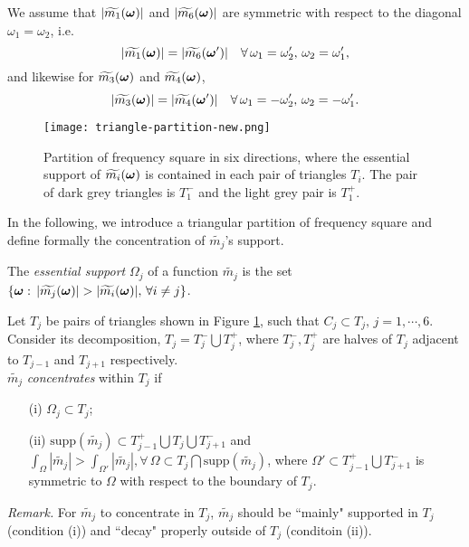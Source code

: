 We assume that
$|\widetilde{m_{1}}(\boldsymbol{\omega})|$ and $|\widetilde{m_{6}}(\boldsymbol{\omega})|$ are symmetric with respect to the diagonal $\omega_1=\omega_2$, i.e.
$$ |\widetilde{m_1}(\boldsymbol{\omega})| = |\widetilde{m_6}(\boldsymbol{\omega}')|\quad \forall\, \omega_1=\omega_2', \,\omega_2=\omega_1',$$
and likewise for $\widetilde{m_{3}}(\boldsymbol{\omega})$ and $\widetilde{m_{4}}(\boldsymbol{\omega})$,
$$ |\widetilde{m_3}(\boldsymbol{\omega})| = |\widetilde{m_4}(\boldsymbol{\omega}')|\quad \forall\, \omega_1=-\omega_2', \,\omega_2=-\omega_1'.$$
\begin{figure}
\centering
\texttt{[image: triangle-partition-new.png]}
\caption{Partition of frequency square in six directions, where the essential support of $\widetilde{m_{i}}(\boldsymbol{\omega})$ is contained in each pair of triangles $T_i$. The pair of dark grey triangles is $T_1^-$ and the light grey pair is $T_1^+$.}
\label{fig: partition 2}
\end{figure}
In the following, we introduce a triangular partition of frequency square and define formally the concentration of $\widetilde{m_j}$'s support.

The {\it essential support} $\Omega_j$ of a function $\widetilde{m_j}$ is the set $\{\V{\omega}:\,|\widetilde{m_j}(\V{\omega})|> |\widetilde{m_i}(\V{\omega})|,\,\forall i\neq j\}$. \vspace{.5em}

Let $T_j$ be pairs of triangles shown in Figure \ref{fig: partition 2}, such that $C_j\subset T_j,\, j = 1,\cdots,6.$ Consider its decomposition, $T_j = T_j^-\bigcup T_j^+$, where $T_j^-, T_j^+$ are halves of $T_j$ adjacent to $T_{j-1}$ and $T_{j+1}$ respectively.\\[.5em]
  $\widetilde{m_j}$ {\it concentrates} within $T_j$ if 
\begin{itemize}
\item[(i)] $\Omega_j\subset T_j$;
\item[(ii)]$\text{supp}(\widetilde{m_j})\subset T_{j-1}^+\bigcup T_j\bigcup T_{j+1}^-$ and $\int_\Omega|\widetilde{m_j}| > \int_{\Omega'}|\widetilde{m_j}|, \forall\, \Omega\subset T_j\bigcap\text{supp}(\widetilde{m_j})$, where $\Omega' \subset T_{j-1}^+\bigcup T_{j+1}^-$ is symmetric to $\Omega$ with respect to the boundary of $T_j$.
\end{itemize}
{\it Remark.}
For $\widetilde{m_j}$ to concentrate in $T_j$, $\widetilde{m_j}$ should be ``mainly" supported in $T_j$ (condition (i)) and ``decay" properly outside of $T_j$ (conditoin (ii)).

